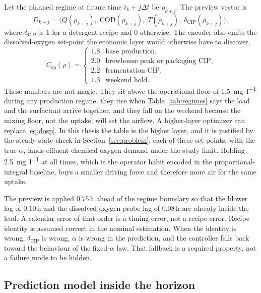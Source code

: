 Let the planned regime at future time $t_{k}+j\Delta t$ be $\rho_{k+j}$. The preview vector is
\begin{equation}
\label{eq:preview}
D_{k+j}
=
\big(
Q(\rho_{k+j}),\;
\mathrm{COD}(\rho_{k+j}),\;
T(\rho_{k+j}),\;
\delta_{\mathrm{CIP}}(\rho_{k+j})
\big),
\end{equation}
where $\delta_{\mathrm{CIP}}$ is $1$ for a detergent recipe and $0$ otherwise. The encoder also emits the dissolved-oxygen set-point the economic layer would otherwise have to discover,
\begin{equation}
\label{eq:dosp}
C_{\mathrm{sp}}(\rho)
=
\begin{cases}
1.8 & \text{base production},\\
2.0 & \text{brewhouse peak or packaging CIP},\\
2.2 & \text{fermentation CIP},\\
1.3 & \text{weekend hold}.
\end{cases}
\end{equation}
These numbers are not magic. They sit above the operational floor of \SI{1.5}{\milli\gram\per\litre} during any production regime, they rise when Table~\ref{tab:regimes} says the load and the surfactant arrive together, and they fall on the weekend because the mixing floor, not the uptake, will set the airflow. A higher-layer optimizer can replace \eqref{eq:dosp}. In this thesis the table is the higher layer, and it is justified by the steady-state check in Section~\ref{sec:problem}: each of these set-points, with the true $\alpha$, lands effluent chemical oxygen demand under the study limit. Holding \SI{2.5}{\milli\gram\per\litre} at all times, which is the operator habit encoded in the proportional-integral baseline, buys a smaller driving force and therefore more air for the same uptake.

The preview is applied $0.75\,\mathrm{h}$ ahead of the regime boundary so that the blower lag of $0.10\,\mathrm{h}$ and the dissolved-oxygen probe lag of $0.08\,\mathrm{h}$ are already inside the lead. A calendar error of that order is a timing error, not a recipe error. Recipe identity is assumed correct in the nominal estimation. When the identity is wrong, $\delta_{\mathrm{CIP}}$ is wrong, $\alpha$ is wrong in the prediction, and the controller falls back toward the behaviour of the fixed-$\alpha$ law. That fallback is a required property, not a failure mode to be hidden.

\subsection{Prediction model inside the horizon}

